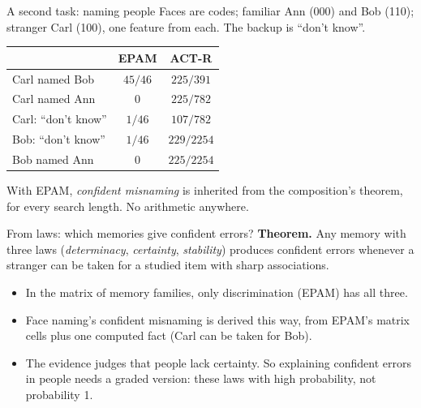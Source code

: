 \documentclass[aspectratio=169,11pt]{beamer}
\begin{document}
\begin{frame}{A second task: naming people}
  Faces are codes; familiar Ann (000) and Bob (110); stranger Carl (100), one feature from each. The backup is ``don't know''.
  \medskip
  \small
  \begin{center}
  \begin{tabular}{lcc}
    \toprule
    & EPAM & ACT-R\\
    \midrule
    Carl named Bob & $45/46$ & $225/391$\\
    Carl named Ann & $0$ & $225/782$\\
    Carl: ``don't know'' & $1/46$ & $107/782$\\
    Bob: ``don't know'' & $1/46$ & $229/2254$\\
    Bob named Ann & $0$ & $225/2254$\\
    \bottomrule
  \end{tabular}
  \end{center}
  \medskip
  \normalsize
  With EPAM, \emph{confident misnaming} is inherited from the composition's theorem, for every search length. No arithmetic anywhere.
\end{frame}

\begin{frame}{From laws: which memories give confident errors?}
  \textbf{Theorem.} Any memory with three laws (\emph{determinacy}, \emph{certainty}, \emph{stability}) produces confident errors whenever a stranger can be taken for a studied item with sharp associations.
  \bigskip
  \begin{itemize}
    \item In the matrix of memory families, only discrimination (EPAM) has all three.
    \item Face naming's confident misnaming is derived this way, from EPAM's matrix cells plus one computed fact (Carl can be taken for Bob).
    \item The evidence judges that people lack certainty. So explaining confident errors in people needs a graded version: these laws with high probability, not probability 1.
  \end{itemize}
\end{frame}
\end{document}

